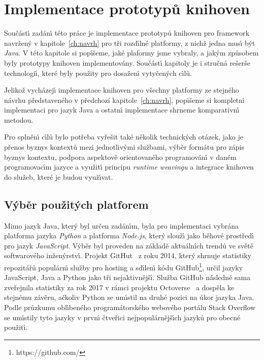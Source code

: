

\chapter{Implementace prototypů knihoven}\label{ch:implementace}

Součást\'{\i} zadán\'{\i} této práce je implementace prototypů
knihoven pro framework navržen\'y v kapitole~\ref{ch:navrh}
pro tři rozd\'{\i}lné platformy, z nichž jedna mus\'{\i} b\'yt \textit{Java}.
V této kapitole si pop\'{\i}šeme, jaké plaformy jsme vybraly, a jak\'ym
způsobem byly prototypy knihoven implementovány. Součást\'{\i}
kapitoly je i stručná rešerše technologi\'{\i}, které byly použity
pro dosažen\'{\i} vytyčen\'ych c\'{\i}lů.

Jelikož vycházej\'{\i} implementace knihoven pro všechny platformy
ze stejného návrhu představeného v předchozí kapitole~\ref{ch:navrh},
pop\'{\i}šeme si kompletn\'{\i} implementaci pro jazyk
Java a ostatn\'{\i} implementace shrneme komparativn\'{\i} metodou.

Pro splněn\'{\i} c\'{\i}lů bylo potřeba vyřešit také několik technick\'ych otázek,
jako je přenos byznys kontextů mezi jednotliv\'ymi službami, v\'yběr formátu
pro zápis byznys kontextu, podpora aspektově orientovaného programován\'{\i}
v daném programovac\'{\i}m jazyce a využit\'{\i} principu \textit{runtime weavingu}
a integrace knihoven do služeb, které je budou využ\'{\i}vat.

\section{V\'yběr použit\'ych platforem}

Mimo jazyk Java, kter\'y byl určen zadán\'{\i}m, byla pro
implementaci vybrána platforma jazyka \textit{Python}
a platforma \textit{Node.js}, kter\'y slouž\'{\i} jako
běhové prostřed\'{\i} pro jazyk \textit{JavaScript}.
V\'yběr byl proveden na základě aktuáln\'{\i}ch trendů
ve světě softwarového inžen\'yrstv\'{\i}. Projekt GitHut~\cite{githut}
z roku 2014, kter\'y shrnuje statistiky repozitářů
populárn\'{\i} služby pro hosting a sd\'{\i}len\'{\i} kódu
GitHub\footnote{https://github.com/}, určil
jazyky JavaScript, Java a Python jako tři nejaktivnějš\'{\i}.
Služba GitHub následně sama zveřejnila statistiky za rok 2017
v rámci projektu Octoverse~\cite{octoverse}
a dospěla ke stejnému závěru, ačkoliv Python se um\'{\i}stil na druhé
pozici na úkor jazyka Java. Podle průzkumu obl\'{\i}beného
programátorského webového portálu Stack
Overflow~\cite{stackoverflowsurvey} se um\'{\i}stily tyto jazyky
v prvn\'{\i} čtveřici nejpopulárnějš\'{\i}ch jazyků pro obecné použit\'{\i}.

